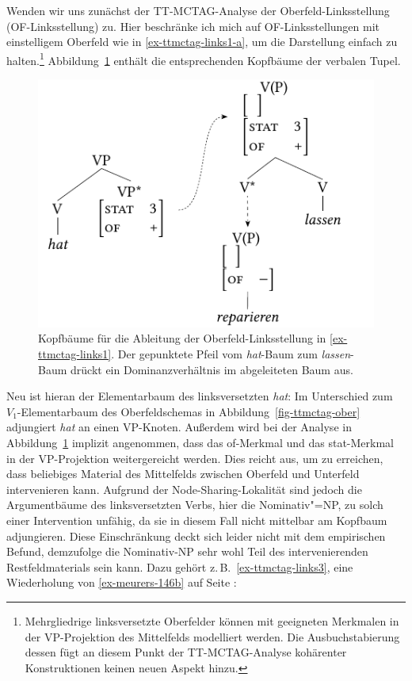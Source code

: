 Wenden wir uns zunächst der TT-MCTAG-Analyse der Oberfeld-Links\-stel\-lung (OF-Links\-stellung) zu. Hier beschränke ich mich auf OF-Linksstellungen mit einstelligem Oberfeld wie in \ref{ex-ttmctag-links1-a}, um die Darstellung einfach zu halten.\footnote{Mehrgliedrige linksversetzte Oberfelder können mit geeigneten Merkmalen in der VP-Projektion des Mittelfelds modelliert werden. Die Ausbuchstabierung dessen fügt an diesem Punkt  der TT-MCTAG-Analyse kohärenter Konstruktionen keinen neuen Aspekt hinzu.} Abbildung~\ref{fig-ttmctag-links1} enthält die entsprechenden Kopfbäume der verbalen Tupel.  
\begin{figure}[t]
\centering
\includegraphics{graphics/abb717.pdf}
\caption{\label{fig-ttmctag-links1}Kopfbäume für die Ableitung der Oberfeld-Linksstellung in \ref{ex-ttmctag-links1}. Der gepunktete Pfeil vom {\it hat}-Baum zum {\it lassen}-Baum drückt ein Dominanzverhältnis im abgeleiteten Baum aus.}
\end{figure}
Neu ist hieran der Elementarbaum des linksversetzten {\it hat}: Im Unterschied zum $V_1$-Elementarbaum des Oberfeldschemas in Abbildung~\ref{fig-ttmctag-ober} adjungiert {\it hat} an einen VP-Knoten. Au\ss erdem wird bei der Analyse in Abbildung~\ref{fig-ttmctag-links1} implizit angenommen, dass das {\sc of}-Merkmal und das {\sc stat}-Merkmal in der VP-Projektion weitergereicht werden. Dies reicht aus, um zu erreichen, dass beliebiges Material des Mittelfelds zwischen Oberfeld und Unterfeld intervenieren kann. Aufgrund der Node-Sharing-Lokalität sind jedoch die Argumentbäume des linksversetzten Verbs, hier die Nominativ"=NP, zu solch einer Intervention unfähig, da sie in diesem Fall nicht mittelbar am Kopfbaum adjungieren. Diese Einschränkung deckt sich leider nicht mit dem empirischen Befund, demzufolge die Nominativ-NP sehr wohl Teil des intervenierenden Restfeldmaterials sein kann. Dazu gehört z.\,B.\ \ref{ex-ttmctag-links3}, eine Wiederholung von \ref{ex-meurers-146b} auf Seite \pageref{ex-meurers-146b}:

